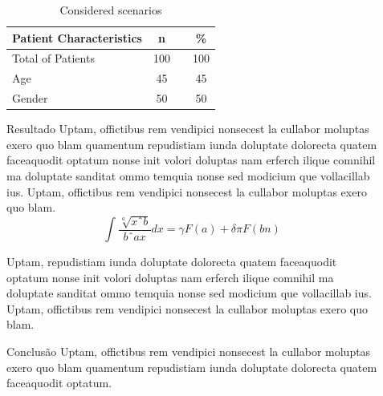 \documentclass[final]{beamer}
\newlength{\sepwid}
\newlength{\onecolwid}
\begin{document}
\begin{frame}[t]
\begin{columns}[t]
\begin{column}{\onecolwid}
			\begin{table}[ht] %
				\centering

				\begin{tabular}{lccc}\hline
					Patient Characteristics & n 		& & \%  \\
					\hline
					Total of Patients 		& 100     	& & 100 \\
					Age 	 				&  45      	& &  45 \\
					Gender 					&  50 	   	& &  50 \\
					\hline
				\end{tabular}
				\caption{Considered scenarios} 
				\label{Patient and tumor Characteristics}
			\end{table}


			\begin{block}{Resultado}
				Uptam, offictibus rem vendipici nonsecest la cullabor moluptas exero quo blam quamentum repudistiam iunda doluptate dolorecta quatem faceaquodit optatum nonse init volori doluptas nam erferch ilique comnihil ma doluptate sanditat ommo temquia nonse sed modicium que vollacillab ius. Uptam, offictibus rem vendipici nonsecest la cullabor moluptas exero quo blam.
				\begin{equation}
					\int\frac{\sqrt[a]{xˆb}}{bˆ{ax}}dx=\gamma F(a)+ \delta \pi F(bn)
				\end{equation}

				Uptam, repudistiam iunda doluptate dolorecta quatem faceaquodit optatum nonse init volori doluptas nam erferch ilique comnihil ma doluptate sanditat ommo temquia nonse sed modicium que vollacillab ius. Uptam, offictibus rem vendipici nonsecest la cullabor moluptas exero quo blam.
			\end{block}

			\begin{block}{Conclusão}
				Uptam, offictibus rem vendipici nonsecest la cullabor moluptas exero quo blam quamentum repudistiam iunda doluptate dolorecta quatem faceaquodit optatum.
			\end{block}

		\end{column}


		\begin{column}{\sepwid}
		\end{column}


		\begin{column}{\onecolwid} %


\end{column}
\end{columns}
\end{frame}
\end{document}

